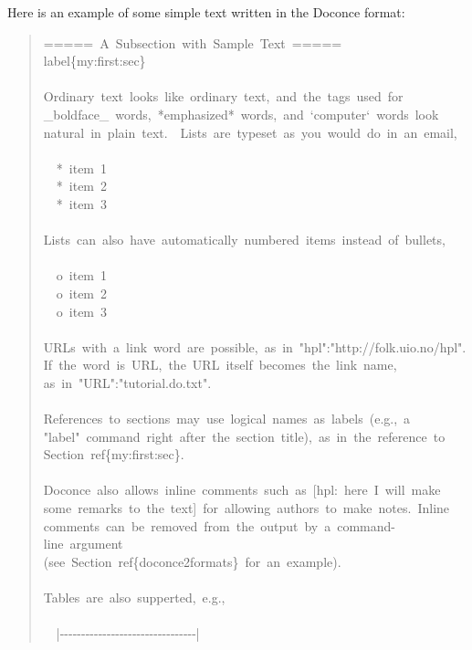 \documentclass[a4paper]{article}
\begin{document}
Here is an example of some simple text written in the Doconce format:
%
\begin{quote}{\ttfamily \raggedright \noindent
=====~A~Subsection~with~Sample~Text~=====\\
label\{my:first:sec\}\\
~\\
Ordinary~text~looks~like~ordinary~text,~and~the~tags~used~for\\
\_boldface\_~words,~*emphasized*~words,~and~`computer`~words~look\\
natural~in~plain~text.~~Lists~are~typeset~as~you~would~do~in~an~email,\\
~\\
~~*~item~1\\
~~*~item~2\\
~~*~item~3\\
~\\
Lists~can~also~have~automatically~numbered~items~instead~of~bullets,\\
~\\
~~o~item~1\\
~~o~item~2\\
~~o~item~3\\
~\\
URLs~with~a~link~word~are~possible,~as~in~"hpl":"http://folk.uio.no/hpl".\\
If~the~word~is~URL,~the~URL~itself~becomes~the~link~name,\\
as~in~"URL":"tutorial.do.txt".\\
~\\
References~to~sections~may~use~logical~names~as~labels~(e.g.,~a\\
"label"~command~right~after~the~section~title),~as~in~the~reference~to\\
Section~ref\{my:first:sec\}.\\
~\\
Doconce~also~allows~inline~comments~such~as~{[}hpl:~here~I~will~make\\
some~remarks~to~the~text{]}~for~allowing~authors~to~make~notes.~Inline\\
comments~can~be~removed~from~the~output~by~a~command-line~argument\\
(see~Section~ref\{doconce2formats\}~for~an~example).\\
~\\
Tables~are~also~supperted,~e.g.,\\
~\\
~~|-{}-{}-{}-{}-{}-{}-{}-{}-{}-{}-{}-{}-{}-{}-{}-{}-{}-{}-{}-{}-{}-{}-{}-{}-{}-{}-{}-{}-{}-{}-{}-|\\
}
\end{quote}
\end{document}
